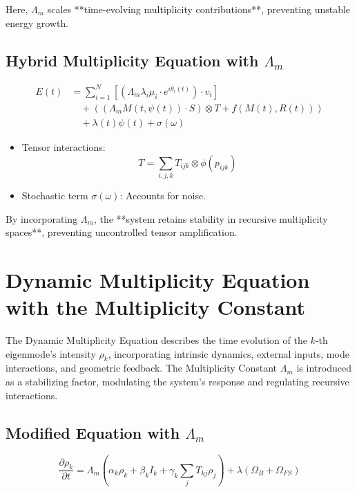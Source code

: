 \documentclass{article}
\theoremstyle{plain}
\begin{document}
Here, \( \Lambda_m \) scales **time-evolving multiplicity contributions**, preventing unstable energy growth.

\subsection{Hybrid Multiplicity Equation with \( \Lambda_m \)}

\begin{align}
E(t) &= \sum_{i=1}^N \left[ \left( \Lambda_m \lambda_i \mu_i \cdot e^{i\theta_i(t)} \right) \cdot v_i \right] \nonumber \\
&\quad + \left( (\Lambda_m M(t, \psi(t)) \cdot S) \otimes T + f(M(t), R(t)) \right) \nonumber \\
&\quad + \lambda(t)\psi(t) + \sigma(\omega)
\end{align}

\begin{itemize}
    \item Tensor interactions:
    \[
    T = \sum_{i,j,k} T_{ijk} \otimes \phi(p_{ijk})
    \]
    \item Stochastic term \( \sigma(\omega) \): Accounts for noise.
\end{itemize}

By incorporating \( \Lambda_m \), the **system retains stability in recursive multiplicity spaces**, preventing uncontrolled tensor amplification.


\section{Dynamic Multiplicity Equation with the Multiplicity Constant}

The Dynamic Multiplicity Equation describes the time evolution of the \( k \)-th eigenmode’s intensity \( \rho_k \), incorporating intrinsic dynamics, external inputs, mode interactions, and geometric feedback. The Multiplicity Constant \( \Lambda_m \) is introduced as a stabilizing factor, modulating the system's response and regulating recursive interactions.

\subsection{Modified Equation with \( \Lambda_m \)}

\begin{equation}
\frac{\partial \rho_k}{\partial t} = \Lambda_m \left( \alpha_k \rho_k + \beta_k I_k + \gamma_k \sum_j T_{kj} \rho_j \right) + \lambda (\Omega_B + \Omega_{FS})
\end{equation}
\end{document}
